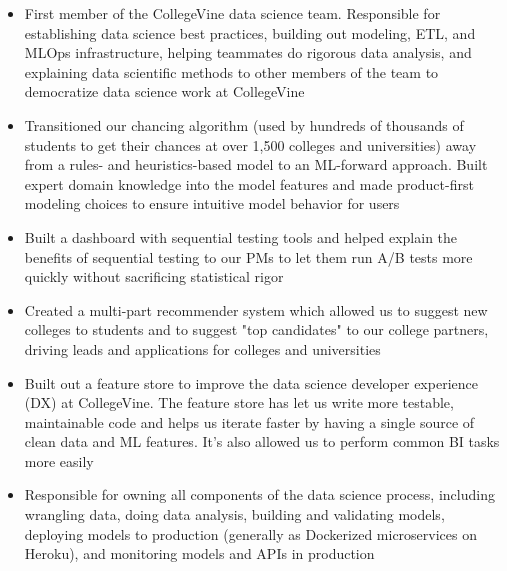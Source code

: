 \documentclass[10pt,a4paper,ragged2e,withhyper]{/Users/matt/documents/GitHub/mrkaye97.github.io/resume/altacv}
\begin{document}
	


	 \makecvheader
		
	
		\begin{itemize}
		\item First member of the CollegeVine data science team. Responsible for establishing data science best practices, building out modeling,  ETL,  and MLOps infrastructure,  helping teammates do rigorous data analysis, and explaining data scientific methods to other members of the team to democratize data science work at CollegeVine
		\item Transitioned our chancing algorithm (used by hundreds of thousands of students to get their chances at over 1,500 colleges and universities) away from a rules- and heuristics-based model to an ML-forward approach. Built expert domain knowledge into the model features and made product-first modeling choices to ensure intuitive model behavior for users
		\item Built a dashboard with sequential testing tools and helped explain the benefits of sequential testing to our PMs to let them run A/B tests more quickly without sacrificing statistical rigor
		\item Created a multi-part recommender system which allowed us to suggest new colleges to students and to suggest "top candidates" to our college partners, driving leads and applications for colleges and universities
		\item Built out a feature store to improve the data science developer experience (DX) at CollegeVine. The feature store has let us write more testable, maintainable code and helps us iterate faster by having a single source of clean data and ML features. It's also allowed us to perform common BI tasks more easily
		\item Responsible for owning all components of the data science process, including wrangling data, doing data analysis, building and validating models, deploying models to production (generally as Dockerized microservices on Heroku), and monitoring models and APIs in production
		\end{itemize}
		
		\divider
		
\end{document}
